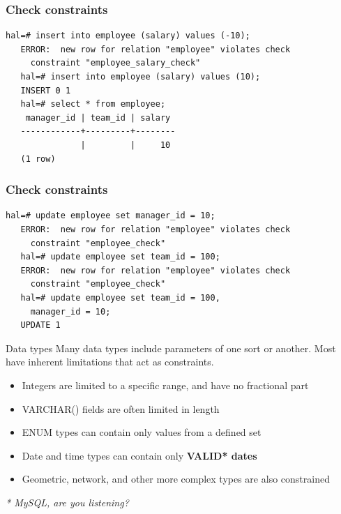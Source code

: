 \documentclass{beamer}
\begin{document}
\begin{frame}[fragile]
    \frametitle{Check constraints}
    \small
    \begin{Verbatim}[fontfamily=courier]
   hal=# insert into employee (salary) values (-10);
   ERROR:  new row for relation "employee" violates check
     constraint "employee_salary_check"
   hal=# insert into employee (salary) values (10);
   INSERT 0 1
   hal=# select * from employee;
    manager_id | team_id | salary
   ------------+---------+--------
               |         |     10
   (1 row)
    \end{Verbatim}
\end{frame}

\begin{frame}[fragile]
    \frametitle{Check constraints}
    \small
    \begin{Verbatim}[fontfamily=courier]
   hal=# update employee set manager_id = 10;
   ERROR:  new row for relation "employee" violates check
     constraint "employee_check"
   hal=# update employee set team_id = 100;
   ERROR:  new row for relation "employee" violates check
     constraint "employee_check"
   hal=# update employee set team_id = 100,
     manager_id = 10;
   UPDATE 1
    \end{Verbatim}
\end{frame}

\begin{frame}{Data types}
    Many data types include parameters of one sort or another. Most have
    inherent limitations that act as constraints.
    \begin{itemize}
        \item Integers are limited to a specific range, and have no fractional part
        \item VARCHAR() fields are often limited in length
        \item ENUM types can contain only values from a defined set
        \item Date and time types can contain only \bf{\color{red}VALID*} dates
        \item Geometric, network, and other more complex types are also constrained
    \end{itemize}
    \vspace{10mm}
    {\footnotesize \color{red} \emph{* MySQL, are you listening?}}
\end{frame}
\end{document}

